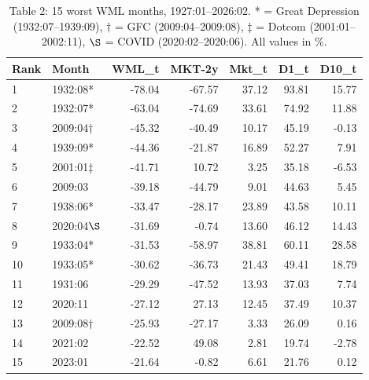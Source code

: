 \documentclass{article}
\begin{document}
\begin{table}[htbp]
  \centering
  \caption{Table 2: 15 worst WML months, 1927:01--2026:02. * = Great Depression (1932:07--1939:09), $\dagger$ = GFC (2009:04--2009:08), $\ddagger$ = Dotcom (2001:01--2002:11), $\S$ = COVID (2020:02--2020:06). All values in \%.}
  \label{tab:table_02_worst_WML_months}
\begin{tabular}{llrrrrr}
\toprule
Rank & Month & WML\_t & MKT-2y & Mkt\_t & D1\_t & D10\_t \\
\midrule
1 & 1932:08* & -78.04 & -67.57 & 37.12 & 93.81 & 15.77 \\
2 & 1932:07* & -63.04 & -74.69 & 33.61 & 74.92 & 11.88 \\
3 & 2009:04$\dagger$ & -45.32 & -40.49 & 10.17 & 45.19 & -0.13 \\
4 & 1939:09* & -44.36 & -21.87 & 16.89 & 52.27 & 7.91 \\
5 & 2001:01$\ddagger$ & -41.71 & 10.72 & 3.25 & 35.18 & -6.53 \\
6 & 2009:03 & -39.18 & -44.79 & 9.01 & 44.63 & 5.45 \\
7 & 1938:06* & -33.47 & -28.17 & 23.89 & 43.58 & 10.11 \\
8 & 2020:04$\S$ & -31.69 & -0.74 & 13.60 & 46.12 & 14.43 \\
9 & 1933:04* & -31.53 & -58.97 & 38.81 & 60.11 & 28.58 \\
10 & 1933:05* & -30.62 & -36.73 & 21.43 & 49.41 & 18.79 \\
11 & 1931:06 & -29.29 & -47.52 & 13.93 & 37.03 & 7.74 \\
12 & 2020:11 & -27.12 & 27.13 & 12.45 & 37.49 & 10.37 \\
13 & 2009:08$\dagger$ & -25.93 & -27.17 & 3.33 & 26.09 & 0.16 \\
14 & 2021:02 & -22.52 & 49.08 & 2.81 & 19.74 & -2.78 \\
15 & 2023:01 & -21.64 & -0.82 & 6.61 & 21.76 & 0.12 \\
\bottomrule
\end{tabular}
\end{table}
\end{document}
